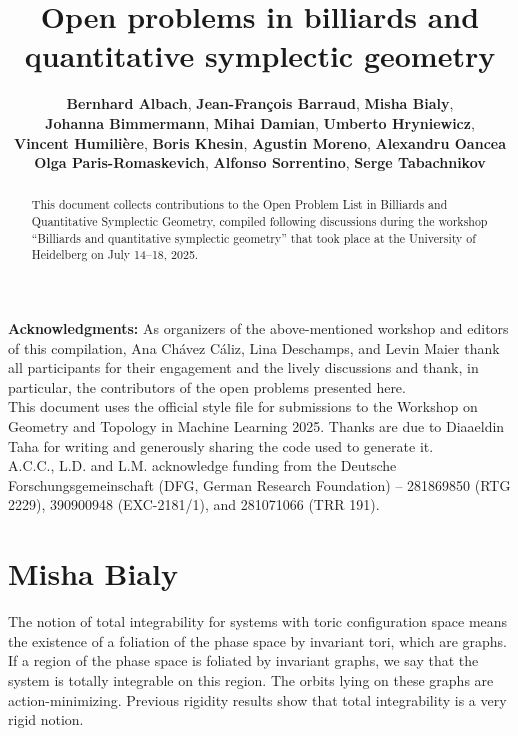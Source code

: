 \documentclass[11pt]{article}
\title{Open problems in billiards and quantitative symplectic geometry}
\author{
\textbf{Bernhard Albach},
\textbf{Jean-Fran\c{c}ois Barraud},
\textbf{Misha Bialy},\\
\textbf{Johanna Bimmermann},
\textbf{Mihai Damian},
\textbf{Umberto Hryniewicz},\\
\textbf{Vincent Humilière},
\textbf{Boris Khesin}, 
\textbf{Agustin Moreno}, 
\textbf{Alexandru Oancea}\\
\textbf{Olga Paris-Romaskevich},
\textbf{Alfonso Sorrentino},  
\textbf{Serge Tabachnikov}
}
\date{}
\theoremstyle{definition}
\begin{document}
\maketitle


\begin{abstract}
This document collects contributions to the Open Problem List in Billiards and Quantitative Symplectic Geometry, compiled following discussions during the workshop ``Billiards and quantitative symplectic geometry'' that took place at the University of Heidelberg on July 14--18, 2025.
\end{abstract}

\textbf{Acknowledgments:}
As organizers of the above-mentioned workshop and editors of this compilation, Ana Chávez Cáliz, Lina Deschamps, and Levin Maier thank all participants for their engagement and the lively discussions and thank, in particular, the contributors of the open problems presented here.\\
This document uses the official style file for submissions to the Workshop on Geometry and Topology in Machine Learning 2025. Thanks are due to Diaaeldin Taha for writing and generously sharing the code used to generate it.\\
A.C.C., L.D. and L.M. acknowledge funding from the Deutsche Forschungsgemeinschaft (DFG, German Research Foundation) – 281869850 (RTG 2229), 390900948 (EXC-2181/1), and 281071066 (TRR 191).


\section*{Misha Bialy}



The notion of total integrability for systems with toric configuration space means the existence of a foliation of the phase space by invariant tori, which are graphs. 
If a region of the phase space is foliated by invariant graphs, we say that the system is totally integrable on this region. The orbits lying on these graphs are action-minimizing. Previous rigidity results \cite{bialy-mironov-survey}
show that total integrability is a very rigid notion.
\end{document}
